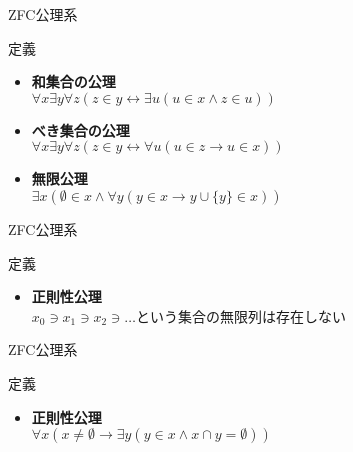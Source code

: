 \documentclass[17pt,aspectratio=169,xcolor=dvipsnames,table,dvipdfmx]{beamer}
\theoremstyle{definition}
\begin{document}
\begin{frame}{ZFC公理系}
    \begin{block}{定義}
        \begin{itemize}
            \item \textbf{和集合の公理} \\
                  $\forall x \exists y \forall z (z \in y \leftrightarrow \exists u (u \in x \land z \in u))$
            \item \textbf{べき集合の公理} \\
                  $ \forall x \exists y \forall z (z \in y \leftrightarrow \forall u (u \in z \rightarrow u \in x))$
            \item \textbf{無限公理} \\
                  $\exists x (\emptyset \in x \land \forall y (y \in x \rightarrow y \cup \{y\} \in x))$
        \end{itemize}
    \end{block}
\end{frame}

\begin{frame}{ZFC公理系}
    \begin{block}{定義}
        \begin{itemize}
            \item \textbf{正則性公理} \\
                  $x_0 \ni x_1 \ni x_2 \ni \dots$という集合の無限列は存在しない
        \end{itemize}
    \end{block}
\end{frame}

\begin{frame}{ZFC公理系}
    \begin{block}{定義}
        \begin{itemize}
            \item \textbf{正則性公理} \\
                  $\forall x (x \neq \emptyset \rightarrow \exists y (y \in x \land x \cap y = \emptyset))$
        \end{itemize}
    \end{block}
\end{frame}
\end{document}
